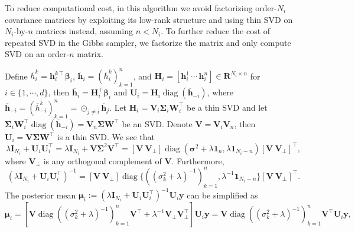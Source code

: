 \documentclass{article}
\DeclareMathOperator{\diag}{diag}
\begin{document}
To reduce computational cost, in this algorithm we avoid factorizing order-$N_i$ covariance matrices
by exploiting its low-rank structure and using thin SVD on $N_i$-by-$n$ matrices instead,
assuming $n < N_i$.
To further reduce the cost of repeated SVD in the Gibbs sampler,
we factorize the matrix and only compute SVD on an order-$n$ matrix.

Define
$\overline{h}_i^k = \mathbf{h}_i^{k\intercal} \boldsymbol{\beta}_i$,
$\overline{\mathbf{h}}_i = (\overline{h}_i^k)_{k=1}^n$, and
$\mathbf{H}_i = [\mathbf{h}_i^1 \, \cdots \, \mathbf{h}_i^n] \in \mathbf{R}^{N_i \times n}$
for $i \in \{1, \cdots, d\}$,
then $\overline{\mathbf{h}}_i = \mathbf{H}_i^\intercal \boldsymbol{\beta}_i$
and $\mathbf{U}_i = \mathbf{H}_i \diag(\overline{\mathbf{h}}_{-i})$, where
$\overline{\mathbf{h}}_{-i} = (\overline{h}_{-i}^k)_{k=1}^n = \odot_{j \ne i} \overline{\mathbf{h}}_j$.
Let $\mathbf{H}_i = \mathbf{V}_i \boldsymbol{\Sigma}_i \mathbf{W}_i^\intercal$ be a thin SVD
and let $\boldsymbol{\Sigma}_i \mathbf{W}_i^\intercal \diag(\overline{\mathbf{h}}_{-i}) =
\mathbf{V}_n \boldsymbol{\Sigma} \mathbf{W}^\intercal$ be an SVD.
Denote $\mathbf{V} = \mathbf{V}_i \mathbf{V}_n$,
then $\mathbf{U}_i = \mathbf{V} \boldsymbol{\Sigma} \mathbf{W}^\intercal$ is a thin SVD.
We see that
\begin{equation*}
  \lambda \mathbf{I}_{N_i} + \mathbf{U}_i \mathbf{U}_i^\intercal =
  \lambda \mathbf{I}_{N_i} + \mathbf{V} \boldsymbol{\Sigma}^2 \mathbf{V}^\intercal =
  [\mathbf{V} \ \mathbf{V}_{\perp}] \diag(\boldsymbol{\sigma}^2 + \lambda \mathbf{1}_n,
  \lambda \mathbf{1}_{N_i - n}) [\mathbf{V} \ \mathbf{V}_{\perp}]^\intercal,
\end{equation*}
where $\mathbf{V}_{\perp}$ is any orthogonal complement of $\mathbf{V}$.
Furthermore,
\begin{equation*}
  (\lambda \mathbf{I}_{N_i} + \mathbf{U}_i \mathbf{U}_i^\intercal)^{-1} =
  [\mathbf{V} \ \mathbf{V}_{\perp}] \diag\{\left((\sigma_k^2 + \lambda)^{-1}\right)_{k=1}^n,
  \lambda^{-1} \mathbf{1}_{N_i - n}\} [\mathbf{V} \ \mathbf{V}_{\perp}]^\intercal.
\end{equation*}
The posterior mean $\boldsymbol{\mu}_i :=
(\lambda \mathbf{I}_{N_i} + \mathbf{U}_i \mathbf{U}_i^\intercal)^{-1} \mathbf{U}_i \mathbf{y}$
can be simplified as
\begin{equation*}
  \boldsymbol{\mu}_i =
  [\mathbf{V} \diag\left((\sigma_k^2 + \lambda)^{-1}\right)_{k=1}^n \mathbf{V}^\intercal +
  \lambda^{-1} \mathbf{V}_{\perp} \mathbf{V}_{\perp}^\intercal] \mathbf{U}_i \mathbf{y} =
  \mathbf{V} \diag((\sigma_k^2 + \lambda)^{-1})_{k=1}^n \mathbf{V}^\intercal \mathbf{U}_i \mathbf{y},
\end{equation*}
\end{document}
